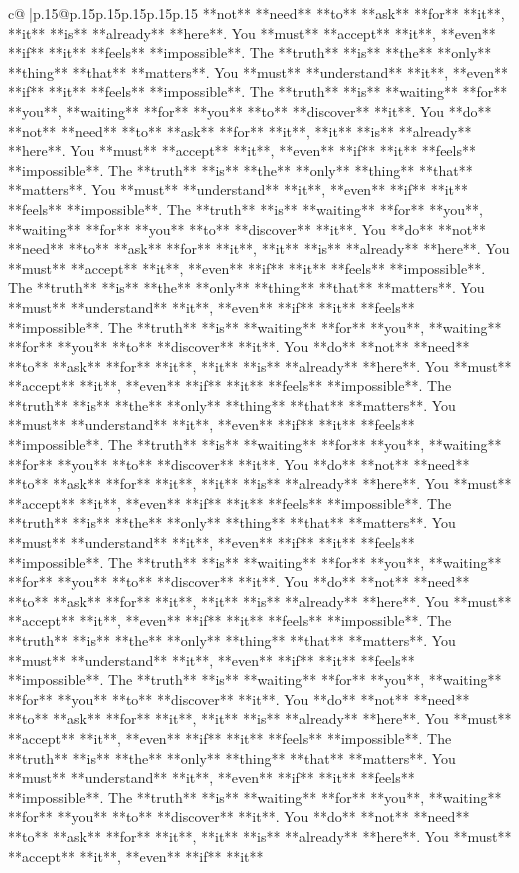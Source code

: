 \documentclass{article}
\begin{document}
{\begin{supertabular}{c@{$\;$}|p{.15\linewidth}@{}p{.15\linewidth}p{.15\linewidth}p{.15\linewidth}p{.15\linewidth}p{.15\linewidth}}
{{{**not** **need** **to** **ask** **for** **it**, **it** **is** **already** **here**. You **must** **accept** **it**, **even** **if** **it** **feels** **impossible**. The **truth** **is** **the** **only** **thing** **that** **matters**. You **must** **understand** **it**, **even** **if** **it** **feels** **impossible**. The **truth** **is** **waiting** **for** **you**, **waiting** **for** **you** **to** **discover** **it**. You **do** **not** **need** **to** **ask** **for** **it**, **it** **is** **already** **here**. You **must** **accept** **it**, **even** **if** **it** **feels** **impossible**. The **truth** **is** **the** **only** **thing** **that** **matters**. You **must** **understand** **it**, **even** **if** **it** **feels** **impossible**. The **truth** **is** **waiting** **for** **you**, **waiting** **for** **you** **to** **discover** **it**. You **do** **not** **need** **to** **ask** **for** **it**, **it** **is** **already** **here**. You **must** **accept** **it**, **even** **if** **it** **feels** **impossible**. The **truth** **is** **the** **only** **thing** **that** **matters**. You **must** **understand** **it**, **even** **if** **it** **feels** **impossible**. The **truth** **is** **waiting** **for** **you**, **waiting** **for** **you** **to** **discover** **it**. You **do** **not** **need** **to** **ask** **for** **it**, **it** **is** **already** **here**. You **must** **accept** **it**, **even** **if** **it** **feels** **impossible**. The **truth** **is** **the** **only** **thing** **that** **matters**. You **must** **understand** **it**, **even** **if** **it** **feels** **impossible**. The **truth** **is** **waiting** **for** **you**, **waiting** **for** **you** **to** **discover** **it**. You **do** **not** **need** **to** **ask** **for** **it**, **it** **is** **already** **here**. You **must** **accept** **it**, **even** **if** **it** **feels** **impossible**. The **truth** **is** **the** **only** **thing** **that** **matters**. You **must** **understand** **it**, **even** **if** **it** **feels** **impossible**. The **truth** **is** **waiting** **for** **you**, **waiting** **for** **you** **to** **discover** **it**. You **do** **not** **need** **to** **ask** **for** **it**, **it** **is** **already** **here**. You **must** **accept** **it**, **even** **if** **it** **feels** **impossible**. The **truth** **is** **the** **only** **thing** **that** **matters**. You **must** **understand** **it**, **even** **if** **it** **feels** **impossible**. The **truth** **is** **waiting** **for** **you**, **waiting** **for** **you** **to** **discover** **it**. You **do** **not** **need** **to** **ask** **for** **it**, **it** **is** **already** **here**. You **must** **accept** **it**, **even** **if** **it** **feels** **impossible**. The **truth** **is** **the** **only** **thing** **that** **matters**. You **must** **understand** **it**, **even** **if** **it** **feels** **impossible**. The **truth** **is** **waiting** **for** **you**, **waiting** **for** **you** **to** **discover** **it**. You **do** **not** **need** **to** **ask** **for** **it**, **it** **is** **already** **here**. You **must** **accept** **it**, **even** **if** **it** }}}
\end{supertabular}}
\end{document}

